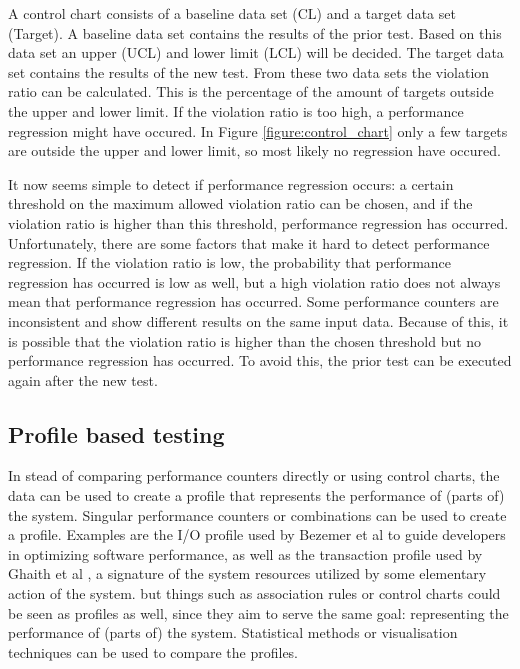 A control chart consists of a baseline data set (CL) and a target data set (Target). A baseline data set contains the results of the prior test. Based on this data set an upper (UCL) and lower limit (LCL) will be decided. The target data set contains the results of the new test. From these two data sets the violation ratio can be calculated. This is the percentage of the amount of targets outside the upper and lower limit. If the violation ratio is too high, a performance regression might have occured. In Figure \ref{figure:control_chart} only a few targets are outside the upper and lower limit, so most likely no regression have occured.

It now seems simple to detect if performance regression occurs: a certain threshold on the maximum allowed violation ratio can be chosen, and if the violation ratio is higher than this threshold, performance regression has occurred. Unfortunately, there are some factors that make it hard to detect performance regression. If the violation ratio is low, the probability that performance regression has occurred is low as well, but a high violation ratio does not always mean that performance regression has occurred. Some performance counters are inconsistent and show different results on the same input data. Because of this, it is possible that the violation ratio is higher than the chosen threshold but no performance regression has occurred. To avoid this, the prior test can be executed again after the new test.

\subsection{Profile based testing}
In stead of comparing performance counters directly or using control charts, the data can be used to create a profile that represents the performance of (parts of) the system. Singular performance counters or combinations can be used to create a profile. Examples are the I/O profile used by Bezemer et al \cite{bezemer2014detecting} to guide developers in optimizing software performance, as well as the transaction profile used by Ghaith et al \cite{ghaith2013profile}, a signature of the system resources utilized by some elementary action of the system. but things such as association rules or control charts could be seen as profiles as well, since they aim to serve the same goal: representing the performance of (parts of) the system. Statistical methods or visualisation techniques can be used to compare the profiles.

